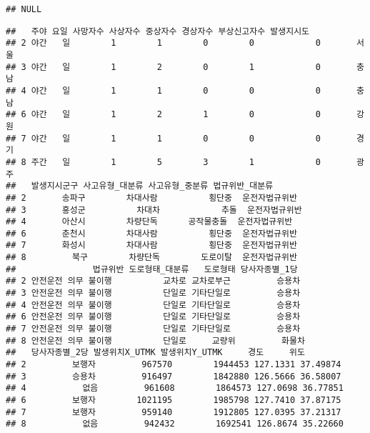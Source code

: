 \documentclass[]{article}
\newenvironment{Shaded}{\begin{snugshade}}{\end{snugshade}}
\newcommand{\KeywordTok}[1]{\textcolor[rgb]{0.13,0.29,0.53}{\textbf{#1}}}
\newcommand{\OperatorTok}[1]{\textcolor[rgb]{0.81,0.36,0.00}{\textbf{#1}}}
\newcommand{\NormalTok}[1]{#1}
\begin{document}
\begin{verbatim}
## NULL
\end{verbatim}

\begin{Shaded}
\end{Shaded}

\begin{verbatim}
##   주야 요일 사망자수 사상자수 중상자수 경상자수 부상신고자수 발생지시도
## 2 야간   일        1        1        0        0            0       서울
## 3 야간   일        1        2        0        1            0       충남
## 4 야간   일        1        1        0        0            0       충남
## 6 야간   일        1        2        1        0            0       강원
## 7 야간   일        1        1        0        0            0       경기
## 8 주간   일        1        5        3        1            0       광주
##   발생지시군구 사고유형_대분류 사고유형_중분류 법규위반_대분류
## 2       송파구        차대사람          횡단중  운전자법규위반
## 3       홍성군          차대차            추돌  운전자법규위반
## 4       아산시        차량단독      공작물충돌  운전자법규위반
## 6       춘천시        차대사람          횡단중  운전자법규위반
## 7       화성시        차대사람          횡단중  운전자법규위반
## 8         북구        차량단독        도로이탈  운전자법규위반
##               법규위반 도로형태_대분류   도로형태 당사자종별_1당
## 2 안전운전 의무 불이행          교차로 교차로부근         승용차
## 3 안전운전 의무 불이행          단일로 기타단일로         승용차
## 4 안전운전 의무 불이행          단일로 기타단일로         승용차
## 6 안전운전 의무 불이행          단일로 기타단일로         승용차
## 7 안전운전 의무 불이행          단일로 기타단일로         승용차
## 8 안전운전 의무 불이행          단일로     교량위         화물차
##   당사자종별_2당 발생위치X_UTMK 발생위치Y_UTMK     경도     위도
## 2         보행자         967570        1944453 127.1331 37.49874
## 3         승용차         916497        1842880 126.5666 36.58007
## 4           없음         961608        1864573 127.0698 36.77851
## 6         보행자        1021195        1985798 127.7410 37.87175
## 7         보행자         959140        1912805 127.0395 37.21317
## 8           없음         942432        1692541 126.8674 35.22660
\end{verbatim}
\end{document}

